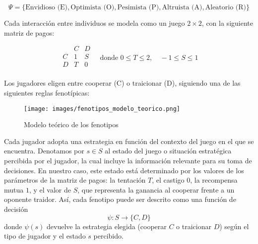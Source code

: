 \documentclass[a4paper,12pt]{report}
\begin{document}
\[
\Psi = \{ \text{Envidioso (E)}, \text{Optimista (O)}, \text{Pesimista (P)}, \text{Altruista (A)}, \text{Aleatorio (R)} \}
\]

Cada interacción entre individuos se modela como un juego \( 2 \times 2 \), con la siguiente matriz de pagos:

\[
\begin{array}{c|cc}
  & C & D \\
\hline
C & 1 & S \\
D & T & 0 \\
\end{array}
\quad \text{donde } 0 \leq T \leq 2, \quad -1 \leq S \leq 1
\]

Los jugadores eligen entre cooperar (C) o traicionar (D), siguiendo una de las siguientes reglas fenotípicas:

\newpage


\begin{figure}[h!]
    \centering
    \texttt{[image: images/fenotipos\_modelo\_teorico.png]}
    \label{fig:fenotipos-modelo}
    \caption{Modelo teórico de los fenotipos}
\end{figure}

Cada jugador adopta una estrategia en función del contexto del juego en el que se encuentra. Denotamos por \( s \in  S \)  al estado del juego o situación estratégica percibida por el jugador, la cual incluye la información relevante para su toma de decisiones. En nuestro caso, este estado está determinado por los valores de los parámetros de la matriz de pagos: la tentación \( T \), el castigo \( 0 \), la recompensa mutua \( 1 \), y el valor de \( S \), que representa la ganancia al cooperar frente a un oponente traidor. Así, cada fenotipo puede ser descrito como una función de decisión
\[
\psi : S \rightarrow \{C, D\}
\]
donde \( \psi(s) \) devuelve la estrategia elegida (cooperar \( C \) o traicionar \( D \)) según el tipo de jugador y el estado \( s \) percibido.
\end{document}
